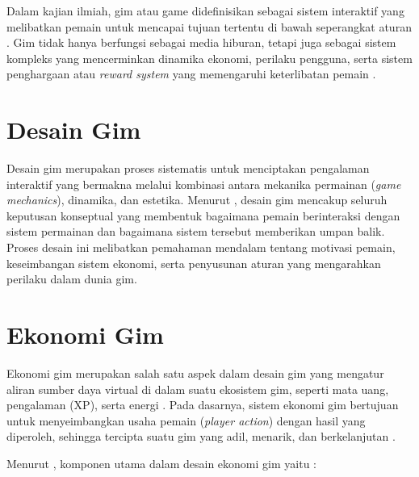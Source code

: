 Dalam kajian ilmiah, gim atau game didefinisikan sebagai sistem interaktif yang melibatkan pemain untuk mencapai tujuan tertentu di bawah seperangkat aturan \citep{salen2004rules}. Gim tidak hanya berfungsi sebagai media hiburan, tetapi juga sebagai sistem kompleks yang mencerminkan dinamika ekonomi, perilaku pengguna, serta sistem penghargaan atau \textit{reward system} yang memengaruhi keterlibatan pemain \citep{hamari2017service}. 

\section{Desain Gim}\label{}

Desain gim merupakan proses sistematis untuk menciptakan pengalaman interaktif yang bermakna melalui kombinasi antara mekanika permainan (\textit{game mechanics}), dinamika, dan estetika. Menurut \cite{schreiber2021game}, desain gim mencakup seluruh keputusan konseptual yang membentuk bagaimana pemain berinteraksi dengan sistem permainan dan bagaimana sistem tersebut memberikan umpan balik. Proses desain ini melibatkan pemahaman mendalam tentang motivasi pemain, keseimbangan sistem ekonomi, serta penyusunan aturan yang mengarahkan perilaku dalam dunia gim.

\section{Ekonomi Gim}\label{}

Ekonomi gim merupakan salah satu aspek dalam desain gim yang mengatur aliran sumber daya virtual di dalam suatu ekosistem gim, seperti mata uang, pengalaman (XP), serta energi \citep{Lin2025}. Pada dasarnya, sistem ekonomi gim bertujuan untuk menyeimbangkan usaha pemain (\textit{player action}) dengan hasil yang diperoleh, sehingga tercipta suatu gim yang adil, menarik, dan berkelanjutan \citep{BowmanKeeneNajera2021}.

Menurut \citet{RanandehMirzaBabaei2023}, komponen utama dalam desain ekonomi gim yaitu :

